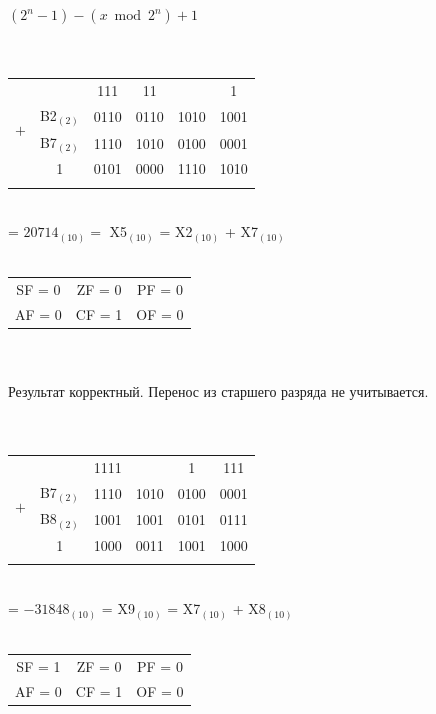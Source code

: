 \documentclass[11pt]{article}
\begin{document}
\begin{paracol}{2}
\begin{enumerate}
		$(2^n-1) -(x \bmod 2^n) + 1$\\\\\\
		\switchcolumn
		\pagebreak{}
		\begin{tabular}[t]{cccccc}
			&&11\phantom{1}1&11\phantom{11}&&\phantom{11}1\phantom{1}\\
			\multirow{2}{*}{$+$} & B2$_{(2)}$ & 0110 & 0110 & 1010 & 1001\\
						            & B7$_{(2)}$ & 1110 & 1010 & 0100 & 0001\\
			\cline{2-6}
						        &   \phantom{000}1     & 0101 & 0000 & 1110 & 1010\\
		\\
		\end{tabular}\\
		= $20714_{(10)} = $ X5$_{(10)}$ = X2$_{(10)}$ + X7$_{(10)}$\\\\
		\begin{tabular}{ccc}
			SF = 0 & ZF = 0 & PF = 0 \\
			AF = 0 & CF = 1 & OF = 0\\
		\end{tabular}\\\\
		Результат корректный. Перенос из старшего разряда не учитывается.
		\\\\\\
		\begin{tabular}[t]{cccccc}
			&&1111&&1\phantom{111}&111\phantom{1}\\
			\multirow{2}{*}{$+$}  & B7$_{(2)}$ & 1110 & 1010 & 0100 & 0001\\
						            & B8$_{(2)}$ & 1001 & 1001 & 0101 & 0111\\
			\cline{2-6}
						       &   1     & 1000 & 0011 & 1001&  1000\\
		\\
		\end{tabular}\\
		= $-31848_{(10)}$ = X9$_{(10)}$ = X7$_{(10)}$ + X8$_{(10)}$\\\\
		\begin{tabular}{ccc}
			SF = 1 & ZF = 0 & PF = 0 \\
			AF = 0 & CF = 1 & OF = 0\\
		\end{tabular}\\\\

\end{enumerate}
\end{paracol}
\end{document}
